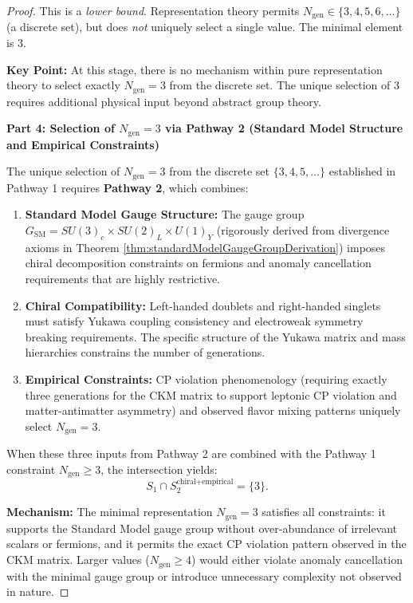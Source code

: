 \begin{theorem}
\begin{proof}
This is a \emph{lower bound}. Representation theory permits $N_{\mathrm{gen}} \in \{3, 4, 5, 6, \ldots\}$ (a discrete set), but does \emph{not} uniquely select a single value. The minimal element is 3.

\textbf{Key Point:} At this stage, there is no mechanism within pure representation theory to select exactly $N_{\mathrm{gen}} = 3$ from the discrete set. The unique selection of 3 requires additional physical input beyond abstract group theory.

\textbf{Part 4: Selection of $N_{\mathrm{gen}} = 3$ via Pathway 2 (Standard Model Structure and Empirical Constraints)}

The unique selection of $N_{\mathrm{gen}} = 3$ from the discrete set $\{3, 4, 5, \ldots\}$ established in Pathway 1 requires \textbf{Pathway 2}, which combines:

\begin{enumerate}
\item \textbf{Standard Model Gauge Structure:} The gauge group $G_{\text{SM}} = SU(3)_c \times SU(2)_L \times U(1)_Y$ (rigorously derived from divergence axioms in Theorem \ref{thm:standardModelGaugeGroupDerivation}) imposes chiral decomposition constraints on fermions and anomaly cancellation requirements that are highly restrictive.

\item \textbf{Chiral Compatibility:} Left-handed doublets and right-handed singlets must satisfy Yukawa coupling consistency and electroweak symmetry breaking requirements. The specific structure of the Yukawa matrix and mass hierarchies constrains the number of generations.

\item \textbf{Empirical Constraints:} CP violation phenomenology (requiring exactly three generations for the CKM matrix to support leptonic CP violation and matter-antimatter asymmetry) and observed flavor mixing patterns uniquely select $N_{\mathrm{gen}} = 3$.
\end{enumerate}

When these three inputs from Pathway 2 are combined with the Pathway 1 constraint $N_{\mathrm{gen}} \geq 3$, the intersection yields:
\begin{equation}
S_1 \cap S_2^{\text{chiral+empirical}} = \{3\}.
\end{equation}

\textbf{Mechanism:} The minimal representation $N_{\mathrm{gen}} = 3$ satisfies all constraints: it supports the Standard Model gauge group without over-abundance of irrelevant scalars or fermions, and it permits the exact CP violation pattern observed in the CKM matrix. Larger values ($N_{\mathrm{gen}} \geq 4$) would either violate anomaly cancellation with the minimal gauge group or introduce unnecessary complexity not observed in nature.


\end{proof}
\end{theorem}

